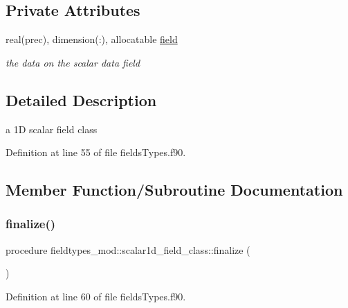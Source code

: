 \subsection*{Private Attributes}
\begin{DoxyCompactItemize}
\item 
real(prec), dimension(\+:), allocatable \mbox{\hyperlink{structfieldtypes__mod_1_1scalar1d__field__class_ab5ea19982bf6390d99095d2ed1509263}{field}}
\begin{DoxyCompactList}\small\item\em the data on the scalar data field \end{DoxyCompactList}\end{DoxyCompactItemize}


\subsection{Detailed Description}
a 1D scalar field class 

Definition at line 55 of file fields\+Types.\+f90.



\subsection{Member Function/\+Subroutine Documentation}
\mbox{\label{structfieldtypes__mod_1_1scalar1d__field__class_a6e7993e87fad9d6b56af43ae1bb0a36a}} 
\subsubsection{\texorpdfstring{finalize()}{finalize()}}
{\footnotesize\ttfamily procedure fieldtypes\+\_\+mod\+::scalar1d\+\_\+field\+\_\+class\+::finalize (\begin{DoxyParamCaption}{ }\end{DoxyParamCaption})\hspace{0.3cm}{\ttfamily [private]}}



Definition at line 60 of file fields\+Types.\+f90.

\mbox{\label{structfieldtypes__mod_1_1scalar1d__field__class_a006ddd4810ef1ddccef091a4600b9925}} 
